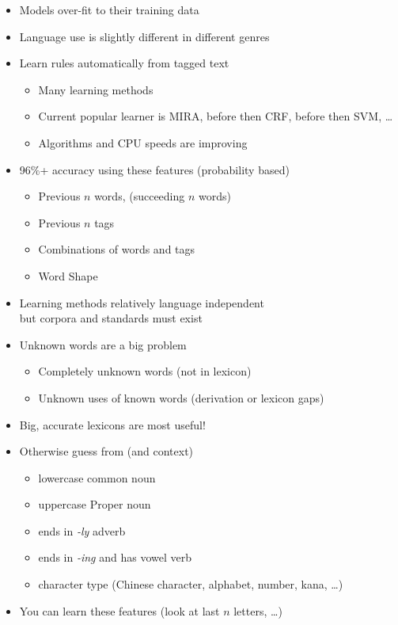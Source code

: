 \documentclass[a4paper,landscape,headrule,footrule,dvips]{foils}
\begin{document}
\begin{CJK}{UTF8}{min}
\begin{itemize}
\item Models over-fit to their training data
\item Language use is slightly different in different genres
\end{itemize}

\MyLogo{}
\begin{itemize}
\item Learn rules automatically from tagged text
  \begin{itemize}
  \item Many learning methods
  \item Current popular learner is MIRA, before then CRF, before then SVM, \ldots
  \item Algorithms and CPU speeds are improving
  \end{itemize}
\item 96\%+ accuracy using these features (probability based)
  \begin{itemize}
  \item Previous $n$ words, (succeeding $n$ words)
  \item Previous $n$ tags
  \item Combinations of words and tags
  \item Word Shape
\end{itemize}
\item Learning methods relatively language independent 
  \\ but corpora and standards must exist
\end{itemize}

\MyLogo{}
\begin{itemize}
\item Unknown words are a big problem
  \begin{itemize}
  \item Completely unknown words (not in lexicon)
  \item Unknown uses of known words (derivation or lexicon gaps)
  \end{itemize}
\item Big, accurate lexicons are most useful!
\item Otherwise guess from  (and context)
  \begin{itemize}
  \item lowercase \into common noun
  \item uppercase \into Proper noun
  \item ends in \textit{-ly} \into adverb
  \item ends in \textit{-ing} and has vowel \into verb
  \item character type (Chinese character, alphabet, number, kana, \ldots)
  \end{itemize}
\item You can learn these features (look at last $n$ letters, \ldots)
\end{itemize}


\end{CJK}
\end{document}
